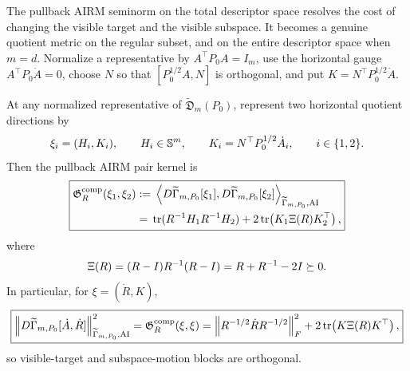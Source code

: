 The pullback AIRM seminorm on the total descriptor space resolves the cost of
changing the visible target and the visible subspace.  It becomes a genuine
quotient metric on the regular subset, and on the entire descriptor space when
\(m=d\).  Normalize a representative by
\(A^\top P_0A=I_m\), use
the horizontal gauge \(A^\top P_0\dot A=0\), choose \(N\) so that
\([P_0^{1/2}A,N]\) is orthogonal, and put
\(K=N^\top P_0^{1/2}\dot A\).

\begin{theorem}
\label{thm:stratified-line-element}
At any normalized representative of
\(\widetilde{\mathfrak D}_m(P_0)\), represent two horizontal quotient
directions by
\[
  \xi_i=(H_i,K_i),
  \qquad H_i\in\mathbb S^m,
  \qquad K_i=N^\top P_0^{1/2}\dot A_i,
  \qquad i\in\{1,2\}.
\]
Then the pullback AIRM pair kernel is
\begin{equation}
  \boxed{
  \begin{aligned}
  \mathfrak G_R^{\mathrm{comp}}(\xi_1,\xi_2)
  &:={}
  \left\langle
  D\widetilde\Gamma_{m,P_0}[\xi_1],
  D\widetilde\Gamma_{m,P_0}[\xi_2]
  \right\rangle_{\widetilde\Gamma_{m,P_0},\mathrm{AI}}
  \\
  &={}
  \operatorname{tr}(R^{-1}H_1R^{-1}H_2)
  +2\operatorname{tr}\!\left(K_1\Xi(R)K_2^\top\right),
  \end{aligned}}
  \label{eq:completion-pair-kernel}
\end{equation}
where
\begin{equation}
  \Xi(R)=(R-I)R^{-1}(R-I)=R+R^{-1}-2I\succeq0.
  \label{eq:mismatch-weight}
\end{equation}
In particular, for \(\xi=(\dot R,K)\),
\begin{equation}
  \boxed{
  \left\lVert D\widetilde\Gamma_{m,P_0}[\dot A,\dot R]\right\rVert_{\widetilde\Gamma_{m,P_0},\mathrm{AI}}^2
  =\mathfrak G_R^{\mathrm{comp}}(\xi,\xi)
  =
  \left\lVert R^{-1/2}\dot R R^{-1/2}\right\rVert_F^2
  +2\operatorname{tr}\!\left(K\Xi(R)K^\top\right),}
  \label{eq:stratified-line-element}
\end{equation}
so visible-target and subspace-motion blocks are orthogonal.


\end{theorem}
